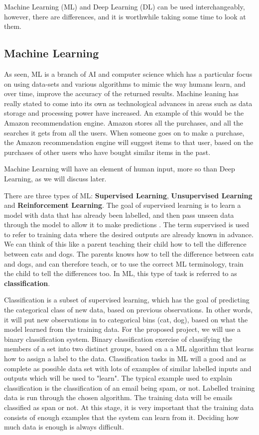 \documentclass[conference]{IEEEtran}
\begin{document}
Machine Learning (ML) and Deep Learning (DL) can be used interchangeably, however, there are differences, and it is worthwhile taking some time to look at them. 

\subsection{Machine Learning}
As seen, ML is a branch of AI and computer science which has a particular focus on using data-sets and various algorithms to mimic the way humans learn, and over time, improve the accuracy of the returned results. Machine leaning has really stated to come into its own as technological advances in areas such as data storage and processing power have increased. An example of this would be the Amazon recommendation engine. Amazon stores all the purchases, and all the searches it gets from all the users. When someone goes on to make a purchase, the Amazon recommendation engine will suggest items to that user, based on the purchases of other users who have bought similar items in the past.

Machine Learning will have an element of human input, more so than Deep Learning, as we will discuss later.

There are three types of ML: \textbf{Supervised Learning}, \textbf{Unsupervised Learning} and \textbf{Reinforcement Learning}. The goal of supervised learning is to learn a model with data that has already been labelled, and then pass unseen data through the model to allow it to make predictions \cite{pythonML}. The term supervised is used to refer to training data where the desired outputs are already known in advance. We can think of this like a parent teaching their child how to tell the difference between cats and dogs. The parents knows how to tell the difference between cats and dogs, and can therefore teach, or to use the correct ML terminology, train the child to tell the differences too. In ML, this type of task is referred to as \textbf{classification}.

Classification is a subset of supervised learning, which has the goal of predicting the categorical class of new data, based on previous observations. In other words, it will put new observations in to categorical bins (cat, dog), based on what the model learned from the training data. For the proposed project, we will use a binary classification system. Binary classification exercise of classifying the members of a set into two distinct groups, based on a a ML algorithm that learns how to assign a label to the data. Classification tasks in ML will a good and as complete as possible data set with lots of examples of similar labelled inputs and outputs which will be used to "learn". The typical example used to explain classification is the classification of an email being spam, or not. Labelled training data is run through the chosen algorithm. The training data will be emails classified as span or not. At this stage, it is very important that the training data consists of enough examples that the system can learn from it. Deciding how much data is enough is always difficult. 
\end{document}
